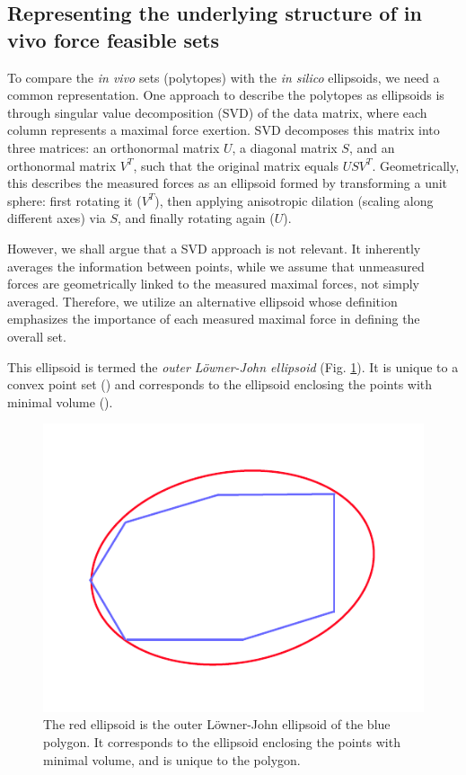 \subsection{Representing the underlying structure of in vivo force feasible sets}
To compare the \emph{in vivo} sets (polytopes) with the \emph{in silico} ellipsoids, we need a common representation. One approach to describe the polytopes as ellipsoids is through singular value decomposition (SVD) of the data matrix, where each column represents a maximal force exertion. SVD decomposes this matrix into three matrices: an orthonormal matrix $U$, a diagonal matrix $S$, and an orthonormal matrix $V^T$, such that the original matrix equals $USV^T$. Geometrically, this describes the measured forces as an ellipsoid formed by transforming a unit sphere: first rotating it ($V^T$), then applying anisotropic dilation (scaling along different axes) via $S$, and finally rotating again ($U$). 

However, we shall argue that a SVD approach is not relevant. It inherently averages the information between points, while we assume that unmeasured forces are geometrically linked to the measured maximal forces, not simply averaged. Therefore, we utilize an alternative ellipsoid whose definition emphasizes the importance of each measured maximal force in defining the overall set.

This ellipsoid is termed the \emph{outer Löwner-John ellipsoid} (Fig. \ref{fig:outer_lj_ellipsoid}). It is unique to a convex point set (\cite{henkLownerJohnEllipsoids2012}) and corresponds to the ellipsoid enclosing the points with minimal volume (\cite{milmanAsymptoticTheoryFinite2001}).

\begin{figure}[!htb]
    \centering
    \captionsetup{justification=centering}

\includegraphics[trim={20 20 20 20}, clip, width=0.3\linewidth]{img/chapter_5/lowner_john_outer.pdf}
    \caption{The red ellipsoid is the outer Löwner-John ellipsoid of the blue polygon. It corresponds to the ellipsoid enclosing the points with minimal volume, and is unique to the polygon.}
    \label{fig:outer_lj_ellipsoid}
\end{figure}

